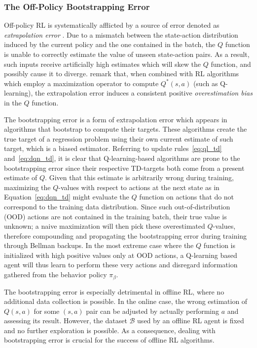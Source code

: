 \subsubsection{The Off-Policy Bootstrapping Error}\label{sec:BE}
Off-policy RL is systematically afflicted by a source of error denoted
as \textit{extrapolation error} \citep{pmlr-v97-fujimoto19a}. Due to a
mismatch between the state-action distribution induced by the current
policy and the one contained in the batch, the $Q$ function is unable
to correctly estimate the value of unseen state-action pairs. As a
result, such inputs receive artificially high estimates which will
skew the $Q$ function, and possibly cause it to
diverge. \citet{pmlr-v97-fujimoto19a} remark that, when combined with
RL algorithms which employ a maximization operator to compute
$Q^*\left(s,a\right)$ (such as Q-learning), the extrapolation error
induces a consistent positive \textit{overestimation bias}
\citep{thrun1993issues} in the $Q$ function.

The bootstrapping error \citep{kumar2019stabilizing} is a form of
extrapolation error which appears in algorithms that bootstrap to
compute their targets. These algorithms create the true target of a
regression problem using their own current estimate of such target,
which is a biased estimator. Referring to update rules~\ref{eq:ql_td}
and~\ref{eq:dqn_td}, it is clear that Q-learning-based algorithms are
prone to the bootstrapping error since their respective TD-targets
both come from a present estimate of $Q$. Given that this estimate is
arbitrarily wrong during training, maximizing the $Q$-values with
respect to actions at the next state as in Equation~\ref{eq:dqn_td}
might
evaluate the $Q$ function on actions that do not correspond to the
training data distribution. Since such out-of-distribution (OOD)
actions \citep{kumar2019stabilizing} are not contained in the training
batch, their true value is unknown; a naive maximization will then
pick these overestimated $Q$-values, therefore compounding and
propagating the bootstrapping error during training through Bellman
backups. In the most extreme case where the $Q$ function is
initialized with high positive values only at OOD actions, a
Q-learning based agent will thus learn to perform these very actions
and disregard information gathered from the behavior policy
$\pi_\beta$.

The bootstrapping error is especially detrimental in offline RL, where
no additional data collection is possible. In the online case, the
wrong estimation of $Q\left(s,a\right)$ for some $\left(s,a\right)$
pair can be adjusted by actually performing $a$ and assessing its
result. However, the dataset $\mathcal{B}$ used by an offline RL agent
is fixed and no further exploration is possible. As a consequence,
dealing with bootstrapping error is crucial for the success of offline
RL algorithms.
